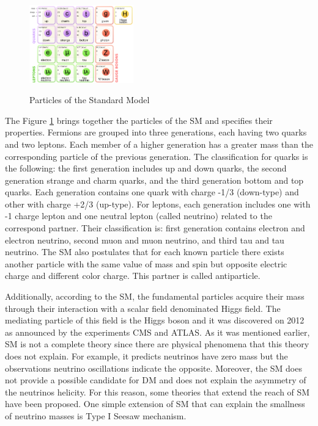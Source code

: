  \begin{figure}[h] 
 \centering
 \caption{Particles of the Standard Model}
 \includegraphics[width=0.4\textwidth]{./Capitulos/StateArt/standard_model} 
 \label{Estandar model}
 \end{figure} 

The Figure \ref{Estandar model} brings together the particles of the SM and specifies their properties. Fermions are grouped into three generations, each having two quarks and two leptons. Each member of a higher generation has a greater mass than the corresponding particle of the previous generation. The classification for quarks is the following: the first generation includes up and down quarks, the second generation strange and charm quarks, and the third generation bottom and top quarks. Each generation contains one quark with charge -1/3 (down-type) and other with charge +2/3 (up-type). For leptons, each generation includes one with -1 charge lepton and one neutral lepton (called neutrino) related to the correspond partner. Their classification is: first generation contains electron and electron neutrino, second muon and muon neutrino, and third tau and tau neutrino. The SM also postulates that for each known particle there exists another particle with the same value of mass and spin but opposite electric charge and different color charge. This partner is called antiparticle.

Additionally, according to the SM, the fundamental particles acquire their mass through their interaction with a scalar field denominated Higgs field. The mediating particle of this field is the Higgs boson and it was discovered on 2012 as announced by the experiments CMS and ATLAS. As it was mentioned earlier, SM is not a complete theory since there are physical phenomena that this theory does not explain. For example, it predicts neutrinos have zero mass but the observations neutrino oscillations indicate the opposite. Moreover, the SM does not provide a possible candidate for DM and does not explain the asymmetry of the neutrinos helicity. For this reason, some theories that extend the reach of SM have been proposed. One simple extension of SM that can explain the smallness of neutrino masses is Type I Seesaw mechanism. 

